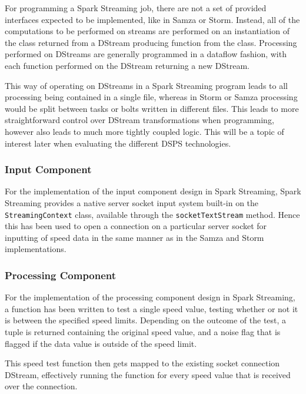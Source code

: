 For programming a Spark Streaming job, there are not a set of provided interfaces expected to be implemented, like in
Samza or Storm. Instead, all of the computations to be performed on streams are performed on an instantiation of the
 class returned from a DStream producing function from the
 class. Processing performed on DStreams are generally programmed in
a dataflow fashion, with each function performed on the DStream returning a new DStream.

This way of operating on DStreams in a Spark Streaming program leads to all processing being contained in a single file,
whereas in Storm or Samza processing would be split between tasks or bolts written in different files. This leads to
more straightforward control over DStream transformations when programming, however also leads to much more tightly
coupled logic. This will be a topic of interest later when evaluating the different DSPS technologies.

\subsubsection{Input Component}

For the implementation of the input component design in Spark Streaming, Spark Streaming provides a native server socket input
system built-in on the \texttt{StreamingContext} class, available through the \texttt{socketTextStream} method. Hence
this has been used to open a connection on a particular server socket for inputting of speed data in the same manner as in the
Samza and Storm implementations.

\subsubsection{Processing Component}

For the implementation of the processing component design in Spark Streaming, a function has been written to test a single
speed value, testing whether or not it is between the specified speed limits. Depending on the outcome of the test,
a tuple is returned containing the original speed value, and a noise flag that is flagged if the data value is outside
of the speed limit.

This speed test function then gets mapped to the existing socket connection DStream, effectively running the function
for every speed value that is received over the connection.

